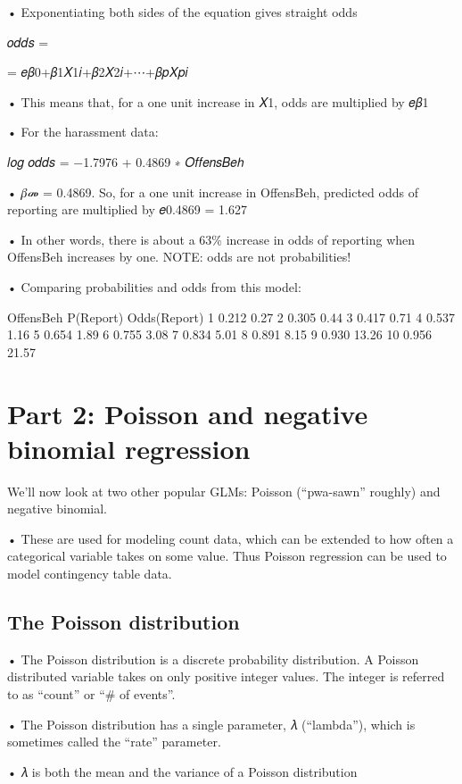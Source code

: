 \documentclass[
  letterpaper,
  DIV=11,
  numbers=noendperiod]{scrreprt}
\begin{document}
• Exponentiating both sides of the equation gives straight odds

𝑜𝑑𝑑𝑠 =

= 𝑒𝛽0+𝛽1𝑋1𝑖+𝛽2𝑋2𝑖+⋯+𝛽𝑝𝑋𝑝𝑖

• This means that, for a one unit increase in 𝑋1, odds are multiplied by
𝑒𝛽1

• For the harassment data:

𝑙𝑜𝑔 𝑜𝑑𝑑𝑠 = −1.7976 + 0.4869 ∗ 𝑂𝑓𝑓𝑒𝑛𝑠𝐵𝑒ℎ

• 𝛽መ = 0.4869. So, for a one unit increase in OffensBeh, predicted odds
of reporting are multiplied by 𝑒0.4869 = 1.627

• In other words, there is about a 63\% increase in odds of reporting
when OffensBeh increases by one. NOTE: odds are not probabilities!

• Comparing probabilities and odds from this model:

OffensBeh P(Report) Odds(Report) 1 0.212 0.27 2 0.305 0.44 3 0.417 0.71
4 0.537 1.16 5 0.654 1.89 6 0.755 3.08 7 0.834 5.01 8 0.891 8.15 9 0.930
13.26 10 0.956 21.57

\hypertarget{part-2-poisson-and-negative-binomial-regression}{%
\section{Part 2: Poisson and negative binomial
regression}\label{part-2-poisson-and-negative-binomial-regression}}

We'll now look at two other popular GLMs: Poisson (``pwa-sawn'' roughly)
and negative binomial.

• These are used for modeling count data, which can be extended to how
often a categorical variable takes on some value. Thus Poisson
regression can be used to model contingency table data.

\hypertarget{the-poisson-distribution}{%
\subsection{The Poisson distribution}\label{the-poisson-distribution}}

• The Poisson distribution is a discrete probability distribution. A
Poisson distributed variable takes on only positive integer values. The
integer is referred to as ``count'' or ``\# of events''.

• The Poisson distribution has a single parameter, 𝜆 (``lambda''), which
is sometimes called the ``rate'' parameter.

• 𝜆 is both the mean and the variance of a Poisson distribution
\end{document}
